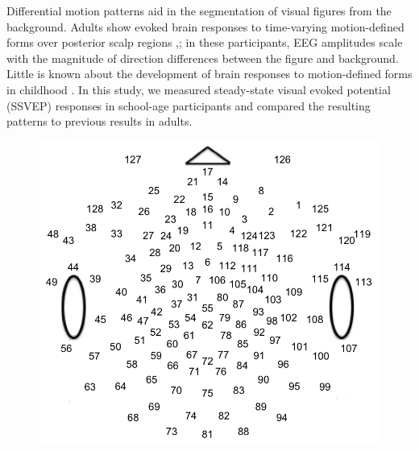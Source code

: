 \documentclass[landscape,final,paperwidth=72in,paperheight=41.5in,fontscale=0.285]{baposter}
\begin{document}
\begin{poster}
%
    {
      Differential motion patterns aid in the segmentation of visual figures from the background. 
      Adults show evoked brain responses to time-varying motion-defined forms over posterior scalp regions \cite{fesi_cortical_2014},\cite{fesi_distinct_2011}; in these participants, EEG amplitudes scale with the magnitude of direction differences between the figure and background.
      Little is known about the development of brain responses to motion-defined forms in childhood \cite{gilmore_childrens_2016}. In this study, we measured steady-state visual evoked potential (SSVEP) responses in school-age participants and compared the resulting patterns to previous results in adults.    
    }
    {
\begin{figure}
\centering
\includegraphics[scale=0.18]{../../figs/figure-egi-channel-locations-1.png}

\end{figure}}
\end{poster}
\end{document}
